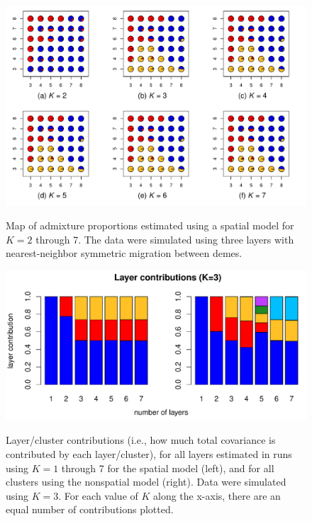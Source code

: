 \documentclass[10pt,letterpaper]{article}
\begin{document}
\begin{figure}
	\centering
		{\includegraphics[width=\textwidth]{figs/sims/simK3_sp_pies.pdf}}
	\caption{
	Map of admixture proportions estimated using a spatial model for $K=2$ through 7.
	The data were simulated using three layers with nearest-neighbor symmetric migration between demes.
    }\label{simK3_sp_pies}
\end{figure}
\clearpage

\begin{figure}
	\centering
		{\includegraphics[width=\textwidth]{figs/sims/simK3_laycon_barplots.pdf}}
		\caption{
			Layer/cluster contributions (i.e., how much total covariance is contributed by each layer/cluster), 
			for all layers estimated in runs using $K = 1$ through 7 
			for the spatial model (left), 
			and for all clusters using the nonspatial model (right).
			Data were simulated using $K=3$.
			For each value of $K$ along the x-axis, there are an equal number of contributions plotted.
		}\label{simK3_laycon}
\end{figure}
\end{document}

